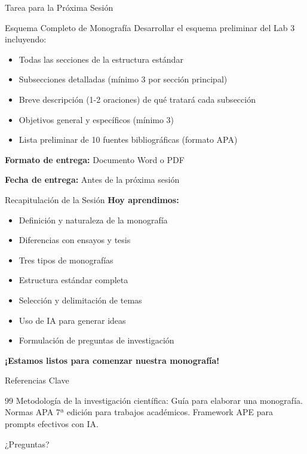 \documentclass[xcolor=table,aspectratio=169,11pt]{beamer}
\begin{document}
	\begin{frame}{Tarea para la Próxima Sesión}
		\begin{block}{Esquema Completo de Monografía}
			Desarrollar el esquema preliminar del Lab 3 incluyendo:
			\begin{itemize}
				\item Todas las secciones de la estructura estándar
				\item Subsecciones detalladas (mínimo 3 por sección principal)
				\item Breve descripción (1-2 oraciones) de qué tratará cada subsección
				\item Objetivos general y específicos (mínimo 3)
				\item Lista preliminar de 10 fuentes bibliográficas (formato APA)
			\end{itemize}
		\end{block}
		
		\vspace{0.3cm}
		\textbf{Formato de entrega:} Documento Word o PDF
		
		\textbf{Fecha de entrega:} Antes de la próxima sesión
	\end{frame}
	
	\begin{frame}{Recapitulación de la Sesión}
		\textbf{Hoy aprendimos:}
		\begin{itemize}
			\item[$\checkmark$] Definición y naturaleza de la monografía
			\item[$\checkmark$] Diferencias con ensayos y tesis
			\item[$\checkmark$] Tres tipos de monografías
			\item[$\checkmark$] Estructura estándar completa
			\item[$\checkmark$] Selección y delimitación de temas
			\item[$\checkmark$] Uso de IA para generar ideas
			\item[$\checkmark$] Formulación de preguntas de investigación
		\end{itemize}
		
		\vspace{0.5cm}
		\begin{center}
			\Large \textbf{¡Estamos listos para comenzar nuestra monografía!}
		\end{center}
	\end{frame}
	
	\begin{frame}{Referencias Clave}
		\small
		\begin{thebibliography}{99}
			 Metodología de la investigación científica: Guía para elaborar una monografía.
			 Normas APA 7ª edición para trabajos académicos.
			 Framework APE para prompts efectivos con IA.
		\end{thebibliography}
		
		\vspace{1cm}
		\begin{center}
			\Large ¿Preguntas?
		\end{center}
	\end{frame}
	
\end{document}
